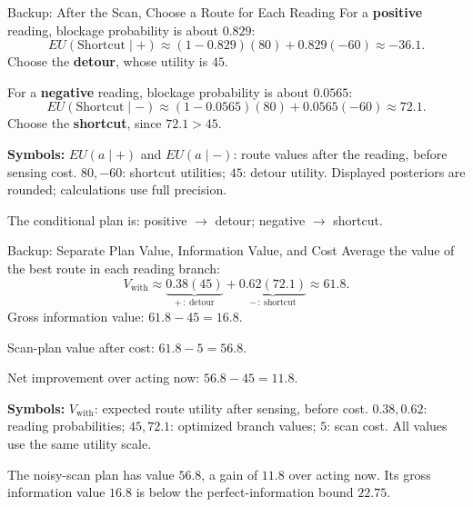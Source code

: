 \documentclass[aspectratio=169,10pt]{beamer}
\newcommand{\equationlegend}[1]{%
  \par\smallskip
  \begingroup
    \setlength{\fboxsep}{4pt}%
    \noindent\colorbox{DeckSoft}{%
      \parbox{\dimexpr\linewidth-2\fboxsep\relax}{%
        \footnotesize\textbf{Symbols:} #1%
      }%
    }\par
  \endgroup
  \smallskip
}
\begin{document}
\begin{frame}[t]{Backup: After the Scan, Choose a Route for Each Reading}
  \small
  For a \textbf{positive} reading, blockage probability is about $0.829$:
  \[
    EU(\text{Shortcut}\mid+)\approx(1-0.829)(80)+0.829(-60)\approx-36.1.
  \]
  Choose the \textbf{detour}, whose utility is $45$.

  \medskip
  For a \textbf{negative} reading, blockage probability is about $0.0565$:
  \[
    EU(\text{Shortcut}\mid-)\approx(1-0.0565)(80)+0.0565(-60)\approx72.1.
  \]
  Choose the \textbf{shortcut}, since $72.1>45$.
  \equationlegend{$EU(a\mid+)$ and $EU(a\mid-)$: route values after the reading, before sensing cost. $80,-60$: shortcut utilities; $45$: detour utility. Displayed posteriors are rounded; calculations use full precision.}
  \begin{keyidea}
    The conditional plan is: positive $\rightarrow$ detour; negative $\rightarrow$ shortcut.
  \end{keyidea}
\end{frame}

\begin{frame}[t]{Backup: Separate Plan Value, Information Value, and Cost}
  \small
  Average the value of the best route in each reading branch:
  \[
    V_{\text{with}}\approx\underbrace{0.38(45)}_{+\,:\ \text{detour}}+
      \underbrace{0.62(72.1)}_{-\,:\ \text{shortcut}}\approx61.8.
  \]
  Gross information value: $61.8-45=16.8$.

  Scan-plan value after cost: $61.8-5=56.8$.

  Net improvement over acting now: $56.8-45=11.8$.
  \equationlegend{$V_{\text{with}}$: expected route utility after sensing, before cost. $0.38,0.62$: reading probabilities; $45,72.1$: optimized branch values; $5$: scan cost. All values use the same utility scale.}
  \begin{keyidea}
    The noisy-scan plan has value $56.8$, a gain of $11.8$ over acting now. Its gross information value $16.8$ is below the perfect-information bound $22.75$.
  \end{keyidea}
\end{frame}
\end{document}
